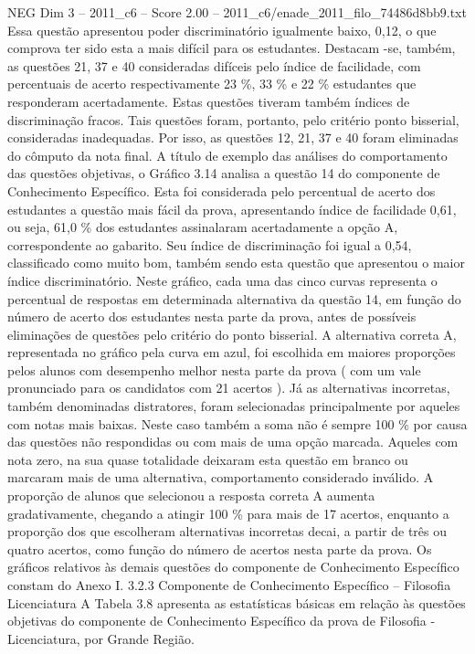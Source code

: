 \begin{textsample}{NEG Dim 3 – 2011\_c6 – Score 2.00 – 2011\_c6/enade\_2011\_filo\_74486d8bb9.txt}
Essa questão apresentou poder discriminatório igualmente baixo, 0,12, o que comprova ter sido esta a mais difícil para os estudantes.
Destacam -se, também, as questões 21, 37 e 40 consideradas difíceis pelo índice de facilidade, com percentuais de acerto respectivamente 23 \%, 33 \% e 22 \% estudantes que responderam acertadamente.
Estas questões tiveram também índices de discriminação fracos.
Tais questões foram, portanto, pelo critério ponto bisserial, consideradas inadequadas.
Por isso, as questões 12, 21, 37 e 40 foram eliminadas do cômputo da nota final.
A título de exemplo das análises do comportamento das questões objetivas, o Gráfico 3.14 analisa a questão 14 do componente de Conhecimento Específico.
Esta foi considerada pelo percentual de acerto dos estudantes a questão mais fácil da prova, apresentando índice de facilidade 0,61, ou seja, 61,0 \% dos estudantes assinalaram acertadamente a opção A, correspondente ao gabarito.
Seu índice de discriminação foi igual a 0,54, classificado como muito bom, também sendo esta questão que apresentou o maior índice discriminatório.
Neste gráfico, cada uma das cinco curvas representa o percentual de respostas em determinada alternativa da questão 14, em função do número de acerto dos estudantes nesta parte da prova, antes de possíveis eliminações de questões pelo critério do ponto bisserial.
A alternativa correta A, representada no gráfico pela curva em azul, foi escolhida em maiores proporções pelos alunos com desempenho melhor nesta parte da prova ( com um vale pronunciado para os candidatos com 21 acertos ).
Já as alternativas incorretas, também denominadas distratores, foram selecionadas principalmente por aqueles com notas mais baixas.
Neste caso também a soma não é sempre 100 \% por causa das questões não respondidas ou com mais de uma opção marcada.
Aqueles com nota zero, na sua quase totalidade deixaram esta questão em branco ou marcaram mais de uma alternativa, comportamento considerado inválido.
A proporção de alunos que selecionou a resposta correta A aumenta gradativamente, chegando a atingir 100 \% para mais de 17 acertos, enquanto a proporção dos que escolheram alternativas incorretas decai, a partir de três ou quatro acertos, como função do número de acertos nesta parte da prova.
Os gráficos relativos às demais questões do componente de Conhecimento Específico constam do Anexo I. 3.2.3 Componente de Conhecimento Específico – Filosofia Licenciatura A Tabela 3.8 apresenta as estatísticas básicas em relação às questões objetivas do componente de Conhecimento Específico da prova de Filosofia - Licenciatura, por Grande Região.

\end{textsample}
